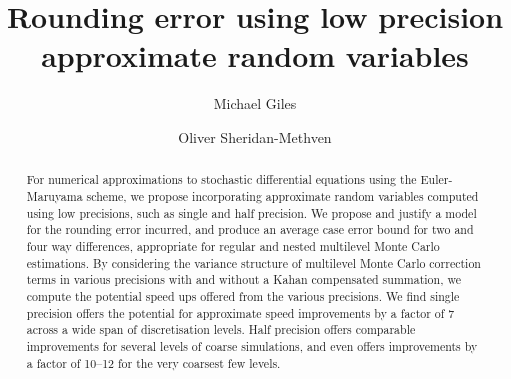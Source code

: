 \documentclass[manuscript,review]{acmart}
\title{Rounding error using low precision approximate random variables}
\author{Michael Giles}
\author{Oliver Sheridan-Methven}
\affiliation{%
\institution{Mathematical Institute, Oxford University}
\city{Oxford}
\country{UK}}
\begin{document}
\begin{abstract}
For numerical approximations to stochastic differential equations using the Euler-Maruyama scheme, we propose incorporating approximate random variables computed using low precisions, such as single and half precision. We propose and justify a model for the rounding error incurred, and produce an average case error bound for two and four way differences, appropriate for regular and nested multilevel Monte Carlo estimations. By considering the variance structure of  multilevel Monte Carlo correction terms in various precisions with and without a Kahan compensated summation, we compute the potential speed ups offered from the various precisions. We find single precision offers the potential for approximate speed improvements by a factor of 7 across a wide span of discretisation levels. Half precision offers comparable improvements for several levels of coarse simulations, and even offers improvements by a factor of 10--12 for the very coarsest few levels. 
\end{abstract}
\end{document}
